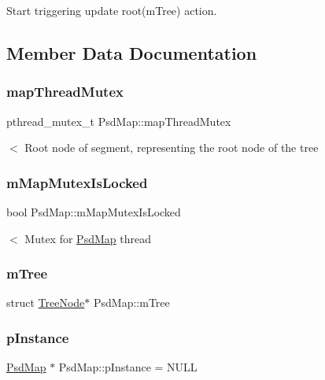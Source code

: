 Start triggering update root(m\+Tree) action. 



\subsection{Member Data Documentation}
\mbox{\label{class_psd_map_a8fbc224227e28dec675589a701b9d8ad}} 
\subsubsection{\texorpdfstring{map\+Thread\+Mutex}{mapThreadMutex}}
{\footnotesize\ttfamily pthread\+\_\+mutex\+\_\+t Psd\+Map\+::map\+Thread\+Mutex}

$<$ Root node of segment, representing the root node of the tree \mbox{\label{class_psd_map_affea202c3988b6f45fe19c8669121816}} 
\subsubsection{\texorpdfstring{m\+Map\+Mutex\+Is\+Locked}{mMapMutexIsLocked}}
{\footnotesize\ttfamily bool Psd\+Map\+::m\+Map\+Mutex\+Is\+Locked}

$<$ Mutex for \hyperlink{class_psd_map}{Psd\+Map} thread \mbox{\label{class_psd_map_a906a31bbf47593efd39648627ec84d04}} 
\subsubsection{\texorpdfstring{m\+Tree}{mTree}}
{\footnotesize\ttfamily struct \hyperlink{struct_tree_node}{Tree\+Node}$\ast$ Psd\+Map\+::m\+Tree}

\mbox{\label{class_psd_map_a9d0824203886b61bfea66530e401dcd1}} 
\subsubsection{\texorpdfstring{p\+Instance}{pInstance}}
{\footnotesize\ttfamily \hyperlink{class_psd_map}{Psd\+Map} $\ast$ Psd\+Map\+::p\+Instance = N\+U\+LL\hspace{0.3cm}{\ttfamily [static]}}

